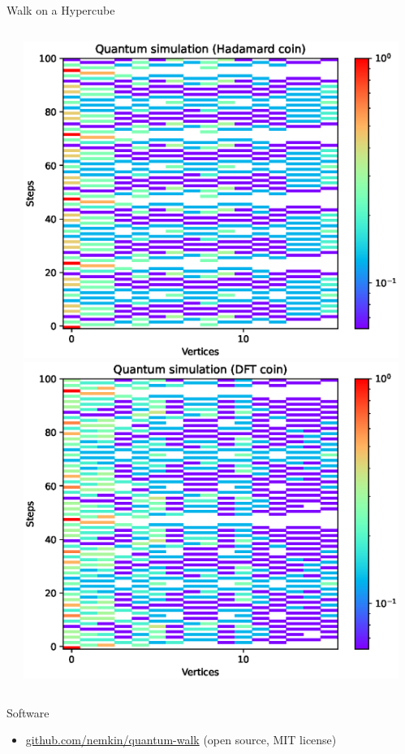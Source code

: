 \documentclass[aspectratio=169]{beamer}
\begin{document}
\begin{frame}{Walk on a Hypercube}
\begin{columns}[onlytextwidth]
\begin{column}{.30\textwidth}
    \end{column}
    \begin{column}{.30\textwidth}
      \includegraphics[width=\textwidth]{./figures/results/hypercube/hadamard.eps}
      \vspace{-1em} %
      \includegraphics[width=\textwidth]{./figures/results/hypercube/dft.eps}
    \end{column}
    \begin{column}{.20\textwidth}
    \end{column}
  \end{columns}
\end{frame}

\begin{frame}{Software}
\begin{itemize}
    \item \url{github.com/nemkin/quantum-walk} (open source, MIT license)
\end{itemize}
\end{frame}
\end{document}
